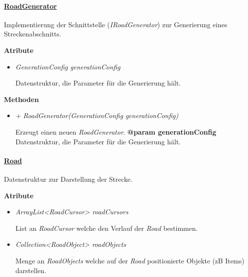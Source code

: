         \paragraph{\underline{RoadGenerator}} \mbox{}\par
            Implementierung der Schnittstelle (\textit{IRoadGenerator}) zur Generierung eines Streckenabschnitts.
            \par

            \textbf{Atribute}					
            \begin{itemize}
                \item  \textit{GenerationConfig generationConfig}
                    \begin{leftbar}[0.9\linewidth]
                        Datenstruktur, die Parameter für die Generierung hält.\\
                    \end{leftbar}
            \end{itemize}
            \textbf{Methoden}					
            \begin{itemize}
                \item  \textit{+ RoadGenerator(GenerationConfig generationConfig)}
                    \begin{leftbar}[0.9\linewidth]
                        Erzeugt einen neuen \textit{RoadGenerator}.
                        \textbf{@param generationConfig} Datenstruktur, die Parameter für die Generierung hält.\\
                    \end{leftbar}
            \end{itemize}



        \paragraph{\underline{Road}} \mbox{}\par
            Datenstruktur zur Darstellung der Strecke.
            \par



            \textbf{Atribute}					
            \begin{itemize}
                \item  \textit{ArrayList<RoadCursor> roadCursors}
                    \begin{leftbar}[0.9\linewidth]
                        List an \textit{RoadCursor} welche den Verlauf der \textit{Road} bestimmen.\\
                    \end{leftbar}
                \item  \textit{Collection<RoadObject> roadObjects}
                \begin{leftbar}[0.9\linewidth]
                    Menge an \textit{RoadObjects} welche auf der \textit{Road} positionierte Objekte (zB Items) darstellen.\\
                \end{leftbar}
            \end{itemize}


